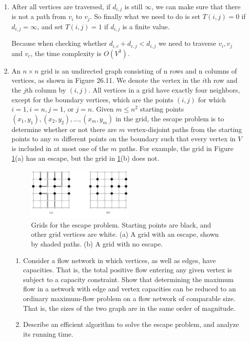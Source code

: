 \documentclass[12pt,a4paper]{article}
\makeatletter
\newtheorem*{solution}{Solution}
\theoremstyle{definition}
\renewenvironment{solution}[1][Solution] {\par\pushQED{\qed}\normalfont\topsep6\p@\@plus6\p@\relax\trivlist\item[\hskip\labelsep\bfseries#1\@addpunct{.}]\ignorespaces}{\popQED\endtrivlist\@endpefalse} \makeatother
\makeatother
\begin{document}
\begin{enumerate}
\begin{solution}
\begin{enumerate}
			After all vertices are traversed, if $ d_{i,j} $ is still $ \infty $, we can make sure that there is not a path from $ v_{i} $ to $ v_j $. So finally what we need to do is set $ T(i,j) = 0 $ if $ d_{i,j} = \infty $, and set $ T(i,j) = 1 $ if $ d_{i,j}$ is a finite value.

			Because when checking whether $ d_{i,c} + d_{c,j} < d_{i,j} $ we need to traverse $ v_i , v_j$ and $ v_c $, the time complexity is $ O(V^3) $.


		\end{enumerate}
	\end{solution}

	\item An $n\times n$ grid is an undirected graph consisting of n rows and n columns of vertices, as shown in Figure 26.11. We denote the vertex in the $i$th row and the $j$th column by $(i,j)$. All vertices in a grid have exactly four neighbors, except for the boundary vertices, which are the points $(i,j)$ for which $i = 1, i = n, j = 1$, or $j = n$.
    Given $m\leqslant n^2$ starting points $(x_1,y_1), (x_2, y_2), ... , (x_m, y_m)$ in the grid, the escape problem is to determine whether or not there are $m$ vertex-disjoint paths from the starting points to any $m$ different points on the boundary such that every vertex in $V$ is included in at most one of the $m$ paths. For example, the grid in Figure \ref{Fig-EscapeProblem}(a) has an escape, but the grid in \ref{Fig-EscapeProblem}(b) does not.
    \begin{figure}[!htbp]
	\centering
	\includegraphics[width=0.5\textwidth]{Fig-EscapeProblem.pdf}
	\caption{Grids for the escape problem. Starting points are black, and other grid vertices are white. (a) A grid with an escape, shown by shaded paths. (b) A grid with no escape.}
	\label{Fig-EscapeProblem}
	\end{figure}
    \begin{enumerate}
        \item Consider a flow network in which vertices, as well as edges, have capacities. That is, the total positive flow entering any given vertex is subject to a capacity constraint. Show that determining the maximum flow in a network with edge and vertex capacities can be reduced to an ordinary maximum-flow problem on a flow network of comparable size. That is, the sizes of the two graph are in the same order of magnitude.
        \item Describe an efficient algorithm to solve the escape problem, and analyze its running time.
    \end{enumerate}
    

\end{enumerate}
\end{document}
